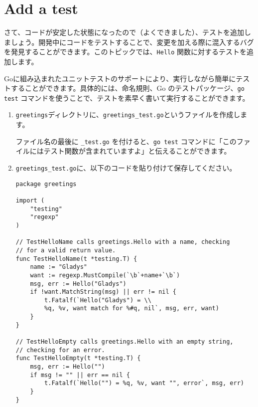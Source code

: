 \section{Add a test}

さて、コードが安定した状態になったので（よくできました）、テストを追加しましょう。開発中にコードをテストすることで、変更を加える際に混入するバグを発見することができます。このトピックでは、\texttt{Hello} 関数に対するテストを追加します。

Goに組み込まれたユニットテストのサポートにより、実行しながら簡単にテストすることができます。具体的には、命名規則、Go のテストパッケージ、\texttt{go test} コマンドを使うことで、テストを素早く書いて実行することができます。




\begin{enumerate}
\item \texttt{greetings}ディレクトリに、\texttt{greetings\_test.go}というファイルを作成します。

ファイル名の最後に \texttt{\_test.go} を付けると、\texttt{go test} コマンドに「このファイルにはテスト関数が含まれていますよ」と伝えることができます。

\item \texttt{greetings\_test.go}に、以下のコードを貼り付けて保存してください。

\begin{lstlisting}[numbers=none]
package greetings

import (
    "testing"
    "regexp"
)

// TestHelloName calls greetings.Hello with a name, checking
// for a valid return value.
func TestHelloName(t *testing.T) {
    name := "Gladys"
    want := regexp.MustCompile(`\b`+name+`\b`)
    msg, err := Hello("Gladys")
    if !want.MatchString(msg) || err != nil {
        t.Fatalf(`Hello("Gladys") = \\
        %q, %v, want match for %#q, nil`, msg, err, want)
    }
}

// TestHelloEmpty calls greetings.Hello with an empty string,
// checking for an error.
func TestHelloEmpty(t *testing.T) {
    msg, err := Hello("")
    if msg != "" || err == nil {
        t.Fatalf(`Hello("") = %q, %v, want "", error`, msg, err)
    }
}
\end{lstlisting}


\end{enumerate}
